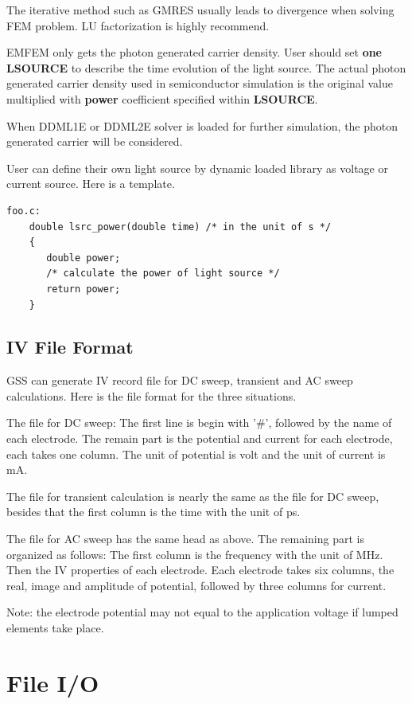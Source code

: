 \documentclass[11pt,pdftex]{article}
\begin{document}
The iterative method such as GMRES usually leads to divergence when
solving FEM problem. LU factorization is highly recommend.

EMFEM only gets the photon generated carrier density. User should
set \textbf{one LSOURCE} to describe the time evolution of the light
source. The actual photon generated carrier density used in
semiconductor simulation is the original value multiplied with
\textbf{power} coefficient specified within \textbf{LSOURCE}.

When DDML1E or DDML2E solver is loaded for further simulation, the
photon generated carrier will be considered.

User can define their own light source by dynamic loaded library as
voltage or current source. Here is a template.
\begin{verbatim}
foo.c:
    double lsrc_power(double time) /* in the unit of s */
    {
       double power;
       /* calculate the power of light source */
       return power;
    }
\end{verbatim}


\newpage
\subsection{IV File Format}
GSS can generate IV record file for DC sweep, transient and AC sweep
calculations. Here is the file format for the three situations.

The file for DC sweep: The first line is begin with '\#', followed
by the name of each electrode. The remain part is the potential and
current for each electrode, each takes one column. The unit of
potential is volt and the unit of current is mA.

The file for transient calculation is nearly the same as the file
for DC sweep, besides that the first column is the time with the
unit of ps.

The file for AC sweep has the same head as above. The remaining part
is organized as follows: The first column is the frequency with the
unit of MHz. Then the IV properties of each electrode. Each
electrode takes six columns, the real, image and amplitude of
potential, followed by three columns for current.

Note: the electrode potential may not equal to the application
voltage if lumped elements take place.

\newpage
\section{File I/O}
\end{document}
